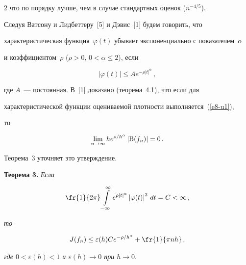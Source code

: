 \begin{multicols}{2}
что по порядку лучше, чем в случае стандартных оценок ($n^{-4/5}$).



Следуя Ватсону и Лидбеттеру~[5] и Дэвис~[1] будем говорить, что

характеристическая функция~$\varphi(t)$ убывает экспоненциально с показателем~$\alpha$ 

и коэффициентом~$\rho$ ($\rho>0$, $0<\alpha\le2$), если

\begin{equation}

\left\vert\varphi(t)\right\vert \le Ae^{-\rho|t|^\alpha}\,,

\label{e8-u1}

\end{equation}

где $A$~--- постоянная. В~[1] доказано (теорема~4.1), что если для

характеристической функции оцениваемой плотности выполняется~(\ref{e8-u1}),

то

$$

\lim\limits_{n\to\infty}he^{\rho/h^\alpha}\left\vert{\rm B}(f_n)\right\vert=0\,.

$$

Теорема~3 уточняет это утверждение.



\smallskip



\noindent

\textbf{Теорема 3.} \textit{Если}

$$

\fr{1}{2\pi}\int\limits_{-\infty}^\infty e^{\rho|t|^\alpha}\left\vert\varphi(t)\right\vert^2\,dt

=C<\infty\,,

$$

\textit{то}

\begin{equation}

J(f_n)\le\varepsilon(h)Ce^{-\rho/h^\alpha}+\fr{1}{\pi nh}\,,

\label{e9-u1}

\end{equation}

\textit{где $0<\varepsilon(h)<1$ и $\varepsilon(h)\to0$ при $h\to0$}.










\end{multicols}
